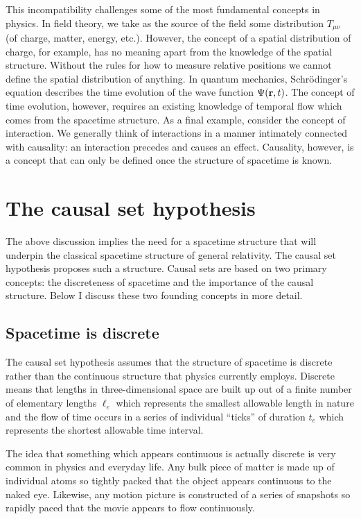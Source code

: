 \documentclass[aps,amssymb,12pt]{revtex4-2}
\begin{document}
This incompatibility challenges some of the most fundamental concepts in
physics. In field theory, we take as the source of the field some
distribution $T_{\mu \nu }$ (of charge, matter, energy, etc.). However, the
concept of a spatial distribution of charge, for example, has no meaning
apart from the knowledge of the spatial structure. Without the rules for how
to measure relative positions we cannot define the spatial distribution of
anything. In quantum mechanics, Schr\"{o}dinger's equation describes the
time evolution of the wave function $\Psi ({\bf r},t)$. The concept of time
evolution, however, requires an existing knowledge of temporal flow which
comes from the spacetime structure. As a final example, consider the concept
of interaction. We generally think of interactions in a manner intimately
connected with causality: an interaction precedes and causes an effect.
Causality, however, is a concept that can only be defined once the structure
of spacetime is known.

\section{The causal set hypothesis}

The above discussion implies the need for a spacetime structure that will
underpin the classical spacetime structure of general relativity. The causal
set hypothesis proposes such a structure. Causal sets are based on two
primary concepts: the discreteness of spacetime and the importance of the
causal structure. Below I discuss these two founding concepts in more detail.

\subsection{Spacetime is discrete}

The causal set hypothesis assumes that the structure of spacetime is
discrete rather than the continuous structure that physics currently
employs. Discrete means that lengths in three-dimensional space are built up
out of a finite number of elementary lengths $\ell _e$ which represents the
smallest allowable length in nature and the flow of time occurs in a series
of individual ``ticks'' of duration $t_e$ which represents the shortest
allowable time interval.

The idea that something which appears continuous is actually discrete is
very common in physics and everyday life. Any bulk piece of matter is made
up of individual atoms so tightly packed that the object appears continuous
to the naked eye. Likewise, any motion picture is constructed of a series of
snapshots so rapidly paced that the movie appears to flow continuously.
\end{document}
